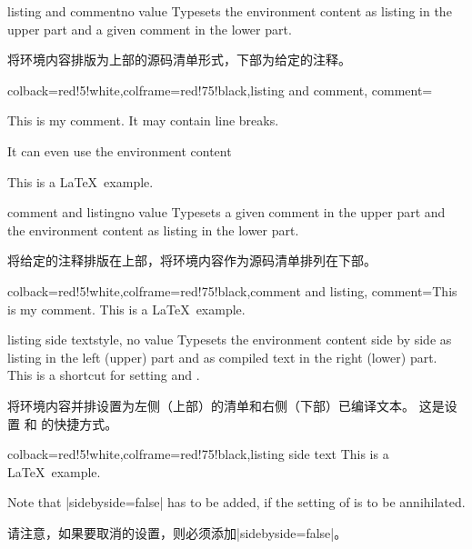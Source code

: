 \begin{docTcbKey}{listing and comment}{}{no value}
Typesets the environment content as listing in the upper part and
a given comment in the lower part.

将环境内容排版为上部的源码清单形式，下部为给定的注释。
\begin{dispExample}
\begin{tcblisting}{colback=red!5!white,colframe=red!75!black,listing and comment,
comment={This is my comment. It may contain line breaks.\par
It can even use the environment content
\flqq\ignorespaces\tcbuselistingtext\unskip\frqq}}
This is a \LaTeX\ example.
\end{tcblisting}
\end{dispExample}
\end{docTcbKey}

\enlargethispage*{10mm}
\begin{docTcbKey}{comment and listing}{}{no value}
Typesets a given comment in the upper part and
the environment content as listing in the lower part.

将给定的注释排版在上部，将环境内容作为源码清单排列在下部。
\begin{dispExample}
\begin{tcblisting}{colback=red!5!white,colframe=red!75!black,comment and listing,
comment={This is my comment.}}
This is a \LaTeX\ example.
\end{tcblisting}
\end{dispExample}
\end{docTcbKey}


\begin{docTcbKey}{listing side text}{}{style, no value}
Typesets the environment content side by side as listing in the left (upper)
part and as compiled text in the right (lower) part.
This is a shortcut for setting  and .

将环境内容并排设置为左侧（上部）的清单和右侧（下部）已编译文本。 这是设置  和  的快捷方式。
\begin{dispExample}
\begin{tcblisting}{colback=red!5!white,colframe=red!75!black,listing side text}
This is a \LaTeX\ example.
\end{tcblisting}
\end{dispExample}
\begin{marker}
Note that |sidebyside=false| has to be added, if the setting of
 is to be annihilated.

请注意，如果要取消的设置，则必须添加|sidebyside=false|。
\end{marker}
\end{docTcbKey}


